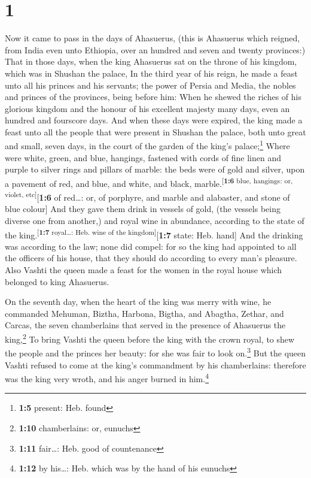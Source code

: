 \hypertarget{section}{%
\section{1}\label{section}}

 Now it came to pass in the days of Ahasuerus, (this is
Ahasuerus which reigned, from India even unto Ethiopia, over an hundred
and seven and twenty provinces:)  That in those days, when
the king Ahasuerus sat on the throne of his kingdom, which was in
Shushan the palace,  In the third year of his reign, he
made a feast unto all his princes and his servants; the power of Persia
and Media, the nobles and princes of the provinces, being before him:
 When he shewed the riches of his glorious kingdom and the
honour of his excellent majesty many days, even an hundred and fourscore
days.  And when these days were expired, the king made a
feast unto all the people that were present in Shushan the palace, both
unto great and small, seven days, in the court of the garden of the
king's palace;\footnote{\textbf{1:5} present: Heb. found} 
Where were white, green, and blue, hangings, fastened with cords of fine
linen and purple to silver rings and pillars of marble: the beds were of
gold and silver, upon a pavement of red, and blue, and white, and black,
marble.\textsuperscript{{[}\textbf{1:6} blue, hangings: or, violet,
etc{]}}{[}\textbf{1:6} of red\ldots: or, of porphyre, and marble and
alabaster, and stone of blue colour{]}  And they gave them
drink in vessels of gold, (the vessels being diverse one from another,)
and royal wine in abundance, according to the state of the
king.\textsuperscript{{[}\textbf{1:7} royal\ldots: Heb. wine of the
kingdom{]}}{[}\textbf{1:7} state: Heb. hand{]}  And the
drinking was according to the law; none did compel: for so the king had
appointed to all the officers of his house, that they should do
according to every man's pleasure.  Also Vashti the queen
made a feast for the women in the royal house which belonged to king
Ahasuerus.

 On the seventh day, when the heart of the king was merry
with wine, he commanded Mehuman, Biztha, Harbona, Bigtha, and Abagtha,
Zethar, and Carcas, the seven chamberlains that served in the presence
of Ahasuerus the king,\footnote{\textbf{1:10} chamberlains: or, eunuchs}
 To bring Vashti the queen before the king with the crown
royal, to shew the people and the princes her beauty: for she was fair
to look on.\footnote{\textbf{1:11} fair\ldots: Heb. good of countenance}
 But the queen Vashti refused to come at the king's
commandment by his chamberlains: therefore was the king very wroth, and
his anger burned in him.\footnote{\textbf{1:12} by his\ldots: Heb. which
  was by the hand of his eunuchs}

